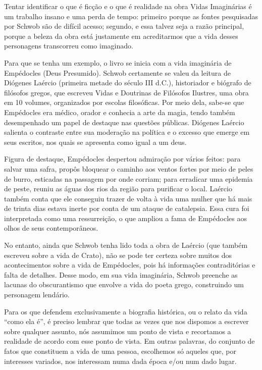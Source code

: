 \documentclass[12pt]{extarticle}
\begin{document}
Tentar identificar o que é ficção e o que é realidade na obra Vidas
Imaginárias é um trabalho insano e uma perda de tempo: primeiro porque
as fontes pesquisadas por Schwob são de difícil acesso; segundo, e essa
talvez seja a razão principal, porque a beleza da obra está justamente
em acreditarmos que a vida desses personagens transcorreu como
imaginado.

Para que se tenha um exemplo, o livro se inicia com a vida imaginária
de Empédocles (Deus Presumido). Schwob certamente se valeu da leitura
de Diógenes Laércio (primeira metade do século III d.C.), historiador e
biógrafo de filósofos gregos, que escreveu Vidas e Doutrinas de
Filósofos Ilustres, uma obra em 10 volumes, organizados por escolas
filosóficas. Por meio dela, sabe-se que Empédocles era médico, orador e
conhecia a arte da magia, tendo também desempenhado um papel de destaque
nas questões públicas. Diógenes Laércio salienta o contraste entre sua
moderação na política e o excesso que emerge em seus escritos, nos quais
se apresenta como igual a um deus.

Figura de destaque, Empédocles despertou admiração por vários feitos:
para salvar uma safra, propôs bloquear o caminho aos ventos fortes por
meio de peles de burro, esticadas na passagem por onde corriam; para
erradicar uma epidemia de peste, reuniu as águas dos rios da região para
purificar o local. Laércio também conta que ele conseguiu trazer de
volta à vida uma mulher que há mais de trinta dias estava inerte por
conta de um ataque de catalepsia. Essa cura foi interpretada como uma
ressurreição, o que ampliou a fama de Empédocles aos olhos de seus
contemporâneos.

No entanto, ainda que Schwob tenha lido toda a obra de Laércio (que
também escreveu sobre a vida de Crato), não se pode ter certeza sobre
muitos dos acontecimentos sobre a vida de Empédocles, pois há
informações contraditórias e falta de detalhes. Desse modo, em sua vida
imaginária, Schwob preenche as lacunas do obscurantismo que envolve a
vida do poeta grego, construindo um personagem lendário.

Para os que defendem exclusivamente a biografia histórica, ou o relato
da vida ``como ela é'', é preciso lembrar que todas as vezes que nos
dispomos a escrever sobre qualquer assunto, nós assumimos um ponto de
vista e recortamos a realidade de acordo com esse ponto de vista. Em
outras palavras, do conjunto de fatos que constituem a vida de uma
pessoa, escolhemos só aqueles que, por interesses variados, nos
interessam numa dada época e/ou num dado lugar.
\end{document}
